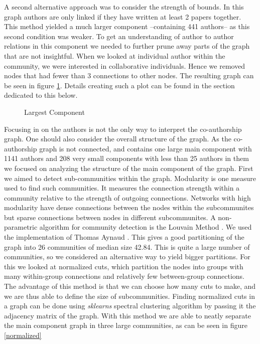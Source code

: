 \documentclass[article,twocolumn]{IEEEtran}
\begin{document}
    A second alternative approach was to consider the strength of bounds. In
this graph authors are only linked if they have written at least 2
papers together. This method yielded a much larger component
--containing 441 authors-- as this second condition was weaker. To get
an understanding of author to author relations in this component we
needed to further prune away parts of the graph that are not insightful.
When we looked at individual author within the community, we were
interested in collaborative individuals. Hence we removed nodes that had
fewer than 3 connections to other nodes. The resulting graph can be seen
in figure \ref{author_collab_large}. Details creating such a plot can be
found in the section dedicated to this below.


    \begin{figure}
        \begin{center}\end{center}
        \caption{Largest Component}
        \label{author_collab_large}
    \end{figure}
    
    Focusing in on the authors is not the only way to interpret the
co-authorship graph. One should also consider the overall structure of
the graph. As the co-authorship graph is not connected, and contains one
large main component with 1141 authors and 208 very small components
with less than 25 authors in them we focused on analyzing the structure
of the main component of the graph. First we aimed to detect
sub-communities within the graph. Modularity is one measure used to find
such communities. It measures the connection strength within a community
relative to the strength of outgoing connections. Networks with high
modularity have dense connections between the nodes within the
subcommunites but sparse connections between nodes in different
subcommunites. A non-parametric algorithm for community detection is the
Louvain Method \cite{blondel2008fast}. We used the implementation of
Thomas Aynaud \cite{louvain}. This gives a good partitioning of the
graph into 26 communities of median size 42.84. This is quite a large
number of communities, so we considered an alternative way to yield
bigger partitions. For this we looked at normalized cuts, which
partition the nodes into groups with many within-group connections and
relatively few between-group connections. The advantage of this method
is that we can choose how many cuts to make, and we are thus able to
define the size of subcommunities. Finding normalized cuts in a graph
can be done using \emph{sklearns} spectral clustering algorithm by
passing it the adjacency matrix of the graph. With this method we are
able to neatly separate the main component graph in three large
communities, as can be seen in figure \ref{normalized}
\end{document}
